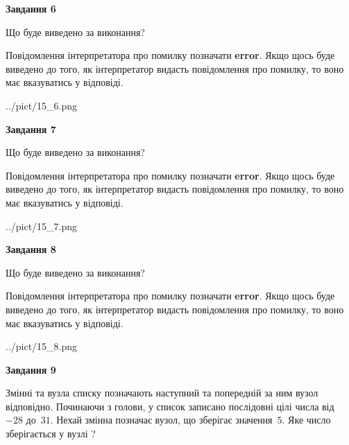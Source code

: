 \documentclass[12pt, ukrainian]{article}
\begin{document}
{\begin {large}
{\begin {center}\textbf{Завдання 6}\end {center}}\par
Що буде виведено за виконання?

Повідомлення інтерпретатора про помилку позначати \textbf{error}.
Якщо щось буде виведено до того, як інтерпретатор видасть повідомлення про помилку, 
то воно має вказуватись у відповіді. \par


\begin{center}
	{../pict/15_6.png}
\end{center}
\newpage

{\begin {center}\textbf{Завдання 7}\end {center}}\par
Що буде виведено за виконання?

Повідомлення інтерпретатора про помилку позначати \textbf{error}.
Якщо щось буде виведено до того, як інтерпретатор видасть повідомлення про помилку, 
то воно має вказуватись у відповіді. \par


\begin{center}
	{../pict/15_7.png}
\end{center}
\newpage

{\begin {center}\textbf{Завдання 8}\end {center}}\par
Що буде виведено за виконання?

Повідомлення інтерпретатора про помилку позначати \textbf{error}.
Якщо щось буде виведено до того, як інтерпретатор видасть повідомлення про помилку, 
то воно має вказуватись у відповіді. \par


\begin{center}
	{../pict/15_8.png}
\end{center}
\newpage

{\begin {center}\textbf{Завдання 9}\end {center}}\par
Змінні  та  вузла списку позначають наступний та попередній за ним вузол відповідно. Починаючи з голови, у список записано послідовні цілі числа від~$-28$ до~$31$. Нехай змінна  позначає вузол, що зберігає значення~$5$.
Яке число зберігається у вузлі  ?\par
\newpage


\end{large}}
\end{document}
